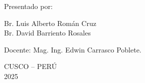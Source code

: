 \begin{titlepage}
\begin{center}
		{\large {Presentado por:}}		
		
		{\large {Br. Luis Alberto Román Cruz	}}\\
		{\large {Br. David Barriento Rosales	}}
		\vspace{0.5cm}
		
		{\large {Docente: Mag. Ing. Edwin Carrasco Poblete.}}
		\vspace{0.5cm}
		
		{\large {CUSCO – PERÚ }}\\
		{\large {2025 }}
		\vspace{0.5cm}
		
		
	\end{center}
\end{titlepage}
